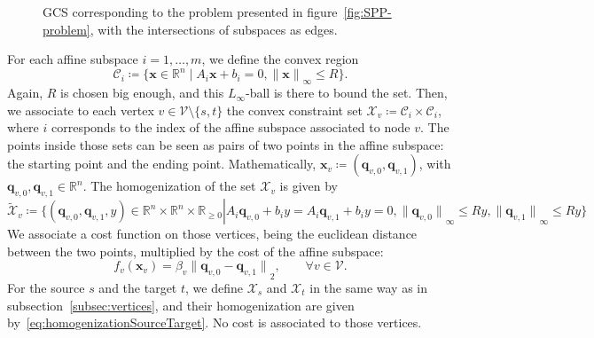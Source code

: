 \documentclass[a4paper, 12pt]{article}
\newlength{\indentsize}
\begin{document}
\begin{figure}[!htb]
    \centering
    \caption{GCS corresponding to the problem presented in figure~\ref{fig:SPP-problem}, with the intersections of subspaces as edges.}\label{fig:edges}
\end{figure}

\hspace{\indentsize} For each affine subspace $i = 1, \dots, m$, we define the convex region \[\mathcal{C}_i \coloneq \{\mathbf{x} \in \mathbb{R}^n \mid A_i \mathbf{x} + b_i = 0, {\lVert \mathbf{x} \rVert}_\infty \leq R\}.\]
Again, $R$ is chosen big enough, and this $L_\infty$-ball is there to bound the set. Then, we associate to each vertex $v \in \mathcal{V}\setminus\{s, t\}$ the convex constraint set $\mathcal{X}_v \coloneq \mathcal{C}_i \times \mathcal{C}_i$, where $i$ corresponds to the index of the affine subspace associated to node $v$. The points inside those sets can be seen as pairs of two points in the affine subspace: the starting point and the ending point. Mathematically, $\mathbf{x}_v \coloneq (\mathbf{q}_{v,0}, \mathbf{q}_{v,1})$, with $\mathbf{q}_{v,0}, \mathbf{q}_{v,1} \in \mathbb{R}^n$. The homogenization of the set $\mathcal{X}_v$ is given by \[\tilde{\mathcal{X}}_v \coloneq \{(\mathbf{q}_{v,0}, \mathbf{q}_{v,1}, y) \in \mathbb{R}^n \times \mathbb{R}^n \times \mathbb{R}_{\geq 0} \left\lvert A_i \mathbf{q}_{v,0} + b_i y = A_i \mathbf{q}_{v,1} + b_i y = 0, {\lVert \mathbf{q}_{v,0} \rVert}_\infty \leq Ry, {\lVert \mathbf{q}_{v,1} \rVert}_\infty \leq Ry \right.\}\]
We associate a cost function on those vertices, being the euclidean distance between the two points, multiplied by the cost of the affine subspace: \[f_v(\mathbf{x}_v) = \beta_v {\lVert \mathbf{q}_{v,0} - \mathbf{q}_{v,1} \rVert}_2, \qquad \forall v \in \mathcal{V}.\]
For the source $s$ and the target $t$, we define $\mathcal{X}_s$ and $\mathcal{X}_t$ in the same way as in subsection~\ref{subsec:vertices}, and their homogenization are given by~\ref{eq:homogenizationSourceTarget}. No cost is associated to those vertices.
\end{document}

